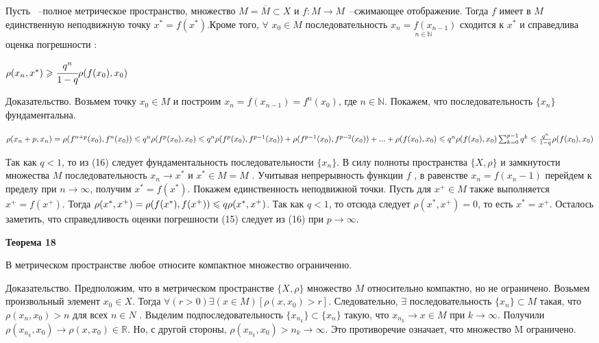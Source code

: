 {Пусть \mes~--полное метрическое пространство, множество $M= \overline M \subset X
    \text{ и } f:M \rightarrow M$~--сжимающее отображение. Тогда $f$ имеет в $M$
единственную неподвижную точку $x^*=f(x^*)$.Кроме того, $\forall$ $x_0
    \in M $ последовательность $\underset{n \in \mathbb{N} }{x_n=f(x_{n-1})}$ сходится
к $x^*$ и справедлива оценка погрешности :

$\rho(x_n, x^*)\geqslant \cfrac{q^n}{1-q}\rho(f(x_0), x_0)$

Доказательство. Возьмем  точку  $x_0  \in M$  и  построим  $x_n  =  f (x_{n-1})  =
    f^n(x_0)$, где $n \in \mathbb{N}$. Покажем, что последовательность $\{x_n\}$ фундаментальна.

$\rho (x_n+p, x_n) = \rho (f^{n+p}(x_0), f^n(x_0)) \leqslant q^n \rho (f^p(x_0), x_0) \leqslant
    q^n{\rho (f^p(x_0), f^{p-1}(x_0)) + \rho (f^{p-1}(x_0), f^{p-2}(x_0)) + ... + \rho (f (x_0), x_0)} \leqslant
    q^n\rho(f(x_0),x_0)\sum^{p-1}_{k=0}q^k\leqslant\frac{q^n}{1-q}\rho(f(x_0),x_0)$

Так как $q < 1$, то из (16) следует фундаментальность последовательности
$\{x_n\}$. В силу полноты пространства $\{X, \rho\}$ и замкнутости множества $M$
последовательность $x_n \to x^{*}$ и $x^{*} \in M = M$ .
Учитывая непрерывность функции $f$ , в равенстве $x_n  = f (x_n-1)$
перейдем к пределу при $n \to \infty$, получим $x^{*} = f (x^{*})$.
Покажем единственность неподвижной точки. Пусть для $x^{+} \in M$ также выполняется
$x^{+} = f (x^{+})$. Тогда $\rho (x^{*}, x^{+}) = \rho (f (x^{*}), f (x^{+})) \leqslant q \rho (x^{*}, x^{+})$.
Так как $q < 1$, то отсюда следует $\rho (x^{*}, x^{+}) = 0$, то есть $x^{*} = x^{+}$.
Осталось заметить, что справедливость оценки погрешности (15) следует из (16)
при $p \to \infty$.


\textbf{Теорема 18   }

В метрическом пространстве любое относите компактное множество ограниченно.

Доказательство. Предположим, что в метрическом пространстве $\{X, \rho\}$
множество $M$ относительно компактно, но не ограничено. 
Возьмем произвольный  элемент  $x_0  \in X$.  
Тогда  $\forall(r  >  0)\exists(x  \in M ) [ \rho(x, x_0)  >  r ]$.  
Следовательно, $\exists$ последовательность $\{x_n\} \subset M$  такая,  
что  $\rho(x_n, x_0)  >  n$ для всех $n \in N$ . 
Выделим подпоследовательность $\{x_{n_{k}} \} \subset \{x_n\}$ такую, что
$x_{n_{k}}   \to x \in M$  при $k \to \infty$. 
Получили $\rho(x_{n_{k}}, x_0) \to \rho(x, x_0) \in \mathbb{R}$. Но, с другой
стороны, $\rho(x_{n_{k}}, x_0) > n_k \to \infty$. Это противоречие означает, что множество M
ограничено.

}

